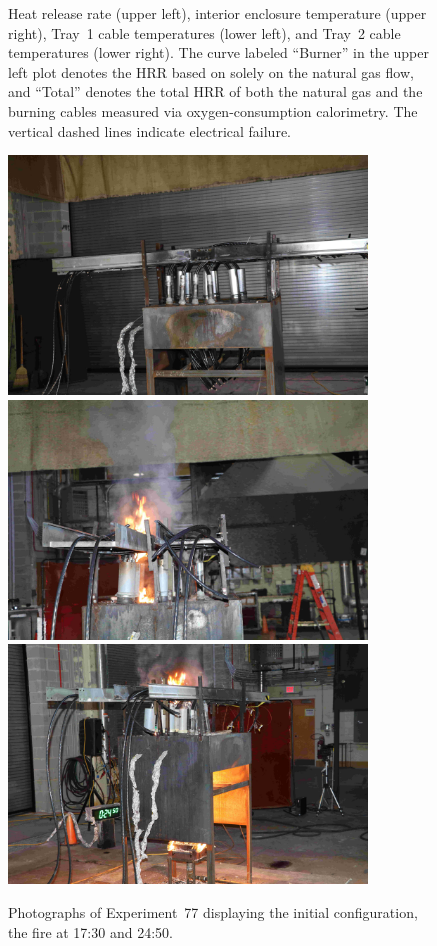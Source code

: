 \begin{figure}[H]
\caption[HRR and temperatures of Experiment 77]{Heat release rate (upper left), interior enclosure temperature (upper right), Tray~1 cable temperatures (lower left), and Tray~2 cable temperatures (lower right). The curve labeled ``Burner'' in the upper left plot denotes the HRR based on solely on the natural gas flow, and ``Total'' denotes the total HRR of both the natural gas and the burning cables measured via oxygen-consumption calorimetry. The vertical dashed lines indicate electrical failure.}
\label{fig:Test_77}
\end{figure}

\begin{figure}[p]
\centering
\includegraphics[height=2.50in]{../FIGURES/Test_77_Photo_1} \\ \vspace{0.1in}
\includegraphics[height=2.50in]{../FIGURES/Test_77_Photo_2} \\ \vspace{0.1in}
\includegraphics[height=2.50in]{../FIGURES/Test_77_Photo_3}
\caption[Photographs of Experiment~77]{Photographs of Experiment~77 displaying the initial configuration, the fire at 17:30 and 24:50.}
\label{fig:Test_77_photos}
\end{figure}


